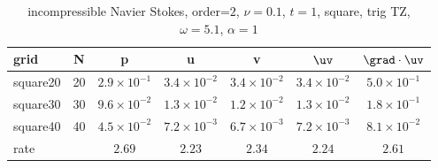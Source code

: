 \begin{table}[hbt]
\begin{center}
\begin{tabular}{|l|c|c|c|c|c|c|} \hline\hline 
grid  & N &  p &  u & v & $\uv$ & $\grad\cdot\uv$\\ \hline 
            square20 &    20 &  $2.9\times10^{ -1}$  &  $3.4\times10^{ -2}$  &  $3.4\times10^{ -2}$  &  $3.4\times10^{ -2}$  &  $5.0\times10^{ -1}$   \\ \hline
            square30 &    30 &  $9.6\times10^{ -2}$  &  $1.3\times10^{ -2}$  &  $1.2\times10^{ -2}$  &  $1.3\times10^{ -2}$  &  $1.8\times10^{ -1}$   \\ \hline
            square40 &    40 &  $4.5\times10^{ -2}$  &  $7.2\times10^{ -3}$  &  $6.7\times10^{ -3}$  &  $7.2\times10^{ -3}$  &  $8.1\times10^{ -2}$   \\ \hline
    rate            &     &       $2.69$ &       $2.23$ &       $2.34$ &       $2.24$ &       $2.61$  \\ \hline\hline
\end{tabular}
\caption{incompressible Navier Stokes, order=$2$, $\nu=0.1$, $t=1$, square, trig TZ, $\omega=5.1$, $\alpha=1$}\label{table:ins.square}
\end{center}
\end{table}


